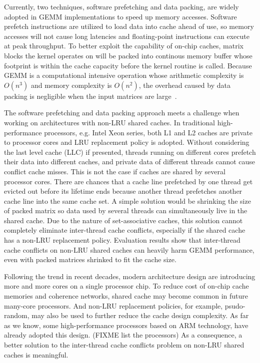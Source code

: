 Currently, two techniques, software prefetching and data packing,
are widely adopted in GEMM implementations to speed up memory accesses.
Software prefetch instructions are utilized
to load data into cache ahead of use, so memory accesses will not
cause long latencies and floating-point instructions can execute at peak throughput.
To better exploit the capability of on-chip caches,
matrix blocks the kernel operates on will be packed into continous memory buffer
whose footprint is within the cache capacity before the kernel routine is called.
Because GEMM is a computational intensive operation whose
arithmetic complexity is $O(n^3)$ and memory complexity is $O(n^2)$,
the overhead caused by data packing is negligible when
the input matrices are large~\cite{gotogemm}.

The software prefetching and data packing approach meets a challenge
when working on architectures with non-LRU shared caches.
In traditional high-performance processors, e.g. Intel Xeon series,
both L1 and L2 caches are private to processor cores
and LRU replacement policy is adopted.
Without considering the last level cache (LLC) if presented,
threads running on different cores prefetch their data into
different caches, and private data of different threads
cannot cause conflict cache misses.
This is not the case if caches are shared by several processor cores.
There are chances that a cache line prefetched by one thread
get evicted out before its lifetime ends because another thread prefetches
another cache line into the same cache set.
A simple solution would be shrinking the size of packed matrix
so data used by several threads can simultaneously live in the shared cache.
Due to the nature of set-associative caches,
this solution cannot completely eliminate inter-thread cache conflicts,
especially if the shared cache has a non-LRU replacement policy.
Evaluation results show that inter-thread cache conflicts on non-LRU shared caches
can heavily harm GEMM performance,
even with packed matrices shrinked to fit the cache size.

Following the trend in recent decades, modern architecture design
are introducing more and more cores on a single processor chip.
To reduce cost of on-chip cache memories and coherence networks,
shared cache may become common in future many-core processors.
And non-LRU replacement policies, for example, psudo-random,
may also be used to further reduce the cache design complexity.
As far as we know, some high-performance processors based on ARM technology,
have already adopted this design. (FIXME list the processors)
As a consequence, a better solution to the inter-thread cache conflicts problem
on non-LRU shared caches is meaningful.

